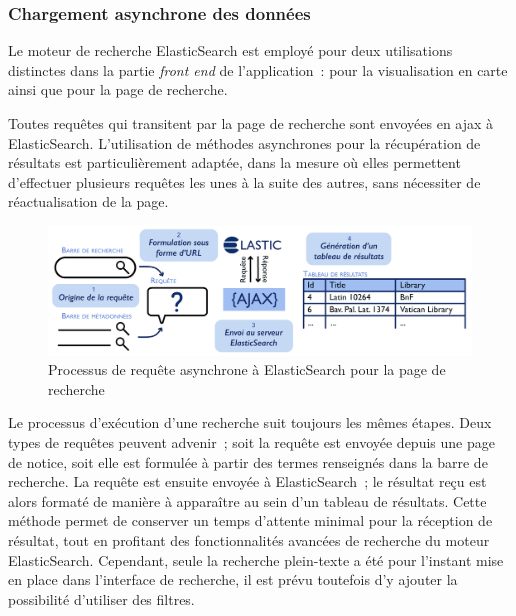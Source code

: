 \documentclass[a4paper,12pt,twoside]{book}
\newcommand{\eng}{\emph}
\newcommand{\ajax}{\gls{ajax}\xspace}
\begin{document}
			\subsubsection{\label{Ajax-Elastic}Chargement asynchrone des données}
Le moteur de recherche ElasticSearch est employé pour deux utilisations distinctes dans la partie \eng{front end} de l'application~: pour la visualisation en carte ainsi que pour la page de recherche.

Toutes requêtes qui transitent par la page de recherche sont envoyées en \ajax à ElasticSearch. L'utilisation de méthodes asynchrones pour la récupération de résultats est particulièrement adaptée, dans la mesure où elles permettent d'effectuer plusieurs requêtes les unes à la suite des autres, sans nécessiter de réactualisation de la page.


\begin{figure}[h!]
	\centering
	\includegraphics[width=16cm]{Images/Requete-Ajax.png}
	\caption{Processus de requête asynchrone à ElasticSearch pour la page de recherche}
\end{figure}

Le processus d'exécution d'une recherche suit toujours les mêmes étapes. Deux types de requêtes peuvent advenir~; soit la requête est envoyée depuis une page de notice, soit elle est formulée à partir des termes renseignés dans la barre de recherche. La requête est ensuite envoyée à ElasticSearch~; le résultat reçu est alors formaté de manière à apparaître au sein d'un tableau de résultats. Cette méthode permet de conserver un temps d'attente minimal pour la réception de résultat, tout en profitant des fonctionnalités avancées de recherche du moteur ElasticSearch. Cependant, seule la recherche plein-texte a été pour l'instant mise en place dans l'interface de recherche, il est prévu toutefois d'y ajouter la possibilité d'utiliser des filtres.
\end{document}
